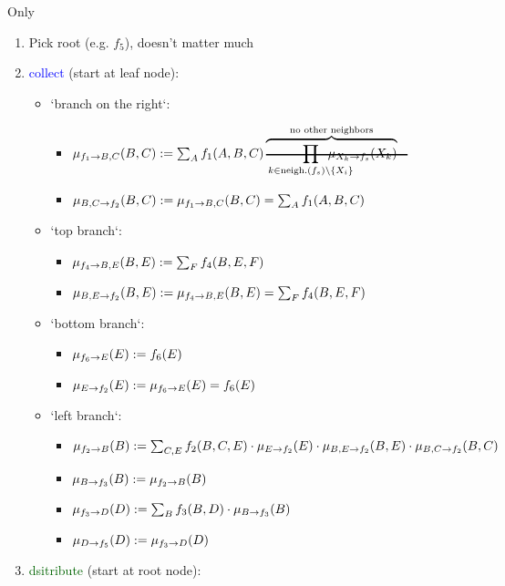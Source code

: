 \begin{frame}{Only}
\begingroup
\footnotesize
\begin{enumerate}
 \item<only@1> Pick root (e.g. $f_{5}$), doesn't matter much%
 \item<only@1-5> \textcolor{blue}{collect} (start at leaf node):
 \begin{itemize}
  \item<only@2> `branch on the right`:
  \begin{itemize}
  \item $\msg{f_{1}}{B,C}(B,C) := \sum_{A} f_{1}(A,B,C) \overbrace{\hcancel{\prod_{k \in \text{neigh.}(f_s)\setminus\{X_i\}}\kern-5ex 
			\mu_{X_k \to f_s}(X_k)}}^{\text{no other neighbors}}$
  \item $\mu_{B,C\rightarrow f_{2}}(B,C) := \mu_{f_{1}\rightarrow B,C}(B,C) = \sum_{A} f_{1}(A,B,C)$
  \end{itemize}
  \item<only@3> `top branch`:
  \begin{itemize}
  \item $\mu_{f_{4}\rightarrow B,E}(B,E) := \sum_{F} f_{4}(B,E,F)$
  \item $\mu_{B,E\rightarrow f_{2}}(B,E) := \mu_{f_{4}\rightarrow B,E}(B,E) = \sum_{F} f_{4}(B,E,F)$
  \end{itemize}
  \item<only@4> `bottom branch`:
  \begin{itemize}
  \item $\mu_{f_{6}\rightarrow E}(E) := f_{6}(E)$
  \item $\mu_{E\rightarrow f_{2}}(E) := \mu_{f_{6}\rightarrow E}(E) = f_{6}(E)$
  \end{itemize}
  \item<only@5> `left branch`:
  \begin{itemize}
  \item $\mu_{f_{2}\rightarrow B}(B) := \sum_{C,E} f_{2}(B,C,E) \cdot \mu_{E\rightarrow f_{2}}(E) \cdot \mu_{B,E\rightarrow f_{2}}(B,E) \cdot \mu_{B,C\rightarrow f_{2}}(B,C)$
  \item $\mu_{B\rightarrow f_{3}}(B) := \mu_{f_{2}\rightarrow B}(B)$
  \item $\mu_{f_{3}\rightarrow D}(D) := \sum_{B} f_{3}(B,D) \cdot \mu_{B\rightarrow f_{3}}(B)$
  \item $\mu_{D\rightarrow f_{5}}(D) := \mu_{f_{3}\rightarrow D}(D)$
  \end{itemize}
 \end{itemize}
 \item<only@6->  \textcolor{darkgreen}{dsitribute} (start at root node):

\end{enumerate}
\end{frame}
